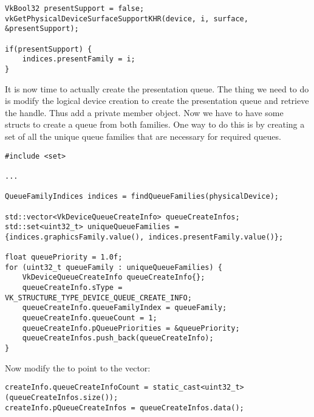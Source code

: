 \begin{center}
\begin{minipage}{0.95\linewidth}
\begin{lstlisting}
VkBool32 presentSupport = false;
vkGetPhysicalDeviceSurfaceSupportKHR(device, i, surface, &presentSupport);

if(presentSupport) {
    indices.presentFamily = i;
}
\end{lstlisting}
\end{minipage}
\end{center}

\par It is now time to actually create the presentation queue. The thing we need to do is modify the logical device creation to create the presentation queue and retrieve the  handle. Thus add a  private member object. Now we have to have some  structs to create a queue from both families. One way to do this is by creating a set of all the unique queue families that are necessary for required queues.

\begin{center}
\begin{minipage}{0.95\linewidth}
\begin{lstlisting}
#include <set>

...

QueueFamilyIndices indices = findQueueFamilies(physicalDevice);

std::vector<VkDeviceQueueCreateInfo> queueCreateInfos;
std::set<uint32_t> uniqueQueueFamilies = {indices.graphicsFamily.value(), indices.presentFamily.value()};

float queuePriority = 1.0f;
for (uint32_t queueFamily : uniqueQueueFamilies) {
    VkDeviceQueueCreateInfo queueCreateInfo{};
    queueCreateInfo.sType = VK_STRUCTURE_TYPE_DEVICE_QUEUE_CREATE_INFO;
    queueCreateInfo.queueFamilyIndex = queueFamily;
    queueCreateInfo.queueCount = 1;
    queueCreateInfo.pQueuePriorities = &queuePriority;
    queueCreateInfos.push_back(queueCreateInfo);
}

\end{lstlisting}
\end{minipage}
\end{center}

\par Now modify the  to point to the vector:

\begin{center}
\begin{minipage}{0.95\linewidth}
\begin{lstlisting}
createInfo.queueCreateInfoCount = static_cast<uint32_t>(queueCreateInfos.size());
createInfo.pQueueCreateInfos = queueCreateInfos.data();
\end{lstlisting}
\end{minipage}
\end{center}


